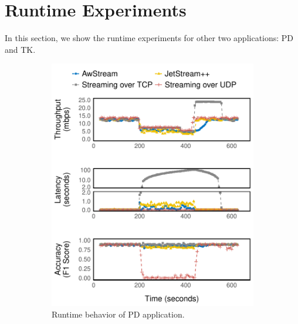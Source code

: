 \section{Runtime Experiments}
\label{appendix:more-runtime}

In this section, we show the runtime experiments for other two applications: PD
and TK.

\begin{figure}[htb]
  \centering
  \begin{subfigure}[t]{0.45\textwidth}
    \centering
    \includegraphics[width=\columnwidth]{figures/runtime-mot-verticle.pdf}
    \caption{Runtime behavior of PD application.}
    \label{fig:pd-runtime}
  \end{subfigure}
  \hfill
  \begin{subfigure}[t]{0.45\textwidth}
    \centering

\end{subfigure}
\end{figure}
